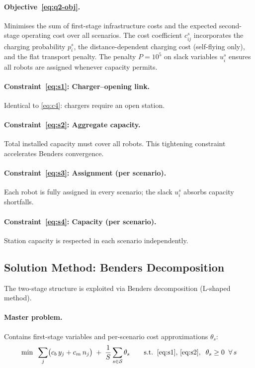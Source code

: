 \documentclass[11pt,a4paper]{article}
\begin{document}
\paragraph{Objective~\eqref{eq:q2-obj}.}
Minimises the sum of first-stage infrastructure costs and the expected second-stage operating cost over all scenarios.
The cost coefficient $c_{ij}^s$ incorporates the charging probability $p_i^s$, the distance-dependent charging cost (self-flying only), and the flat transport penalty.
The penalty $P = 10^5$ on slack variables $u_i^s$ ensures all robots are assigned whenever capacity permits.

\paragraph{Constraint~\eqref{eq:s1}: Charger--opening link.}
Identical to \eqref{eq:c4}: chargers require an open station.

\paragraph{Constraint~\eqref{eq:s2}: Aggregate capacity.}
Total installed capacity must cover all robots. This tightening constraint accelerates Benders convergence.

\paragraph{Constraint~\eqref{eq:s3}: Assignment (per scenario).}
Each robot is fully assigned in every scenario; the slack $u_i^s$ absorbs capacity shortfalls.

\paragraph{Constraint~\eqref{eq:s4}: Capacity (per scenario).}
Station capacity is respected in each scenario independently.


\subsection{Solution Method: Benders Decomposition}
\label{sec:benders}

The two-stage structure is exploited via Benders decomposition (L-shaped method).

\paragraph{Master problem.}
Contains first-stage variables and per-scenario cost approximations $\theta_s$:
\begin{equation}\label{eq:master}
  \min \;\;
  \sum_{j} \bigl(c_b \, y_j + c_m \, n_j\bigr)
  \;+\;
  \frac{1}{S} \sum_{s \in \mathcal{S}} \theta_s
  \qquad \text{s.t.}\;\; \eqref{eq:s1},\, \eqref{eq:s2},\;\;
  \theta_s \geq 0 \;\;\forall\, s
\end{equation}
\end{document}
